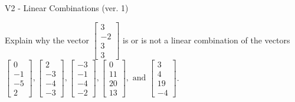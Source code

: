 \begin{exercise}
  \begin{exerciseTitle}V2 - Linear Combinations (ver. 1)\end{exerciseTitle}
  \begin{exerciseStatement}
    Explain why the vector \(\left[\begin{array}{c}
3 \\
-2 \\
3 \\
3
\end{array}\right]\)  is or is not a linear 
	combination of the vectors \(\left[\begin{array}{c}
0 \\
-1 \\
-5 \\
2
\end{array}\right] , \left[\begin{array}{c}
2 \\
-3 \\
-4 \\
-3
\end{array}\right] , \left[\begin{array}{c}
-3 \\
-1 \\
-4 \\
-2
\end{array}\right] , \left[\begin{array}{c}
0 \\
11 \\
20 \\
13
\end{array}\right] , \text{ and } \left[\begin{array}{c}
3 \\
4 \\
19 \\
-4
\end{array}\right]\).
	



\end{exerciseStatement}
\end{exercise}

